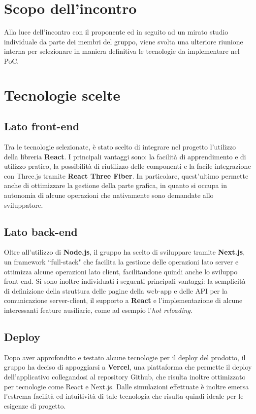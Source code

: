 \section{Scopo dell'incontro} \label{sec:argomenti}
Alla luce dell'incontro con il proponente ed in seguito ad un mirato studio individuale da parte dei membri del gruppo, viene svolta una ulteriore riunione interna per selezionare in maniera definitiva le tecnologie da implementare nel PoC. 

\section{Tecnologie scelte}
\subsection{Lato front-end}
Tra le tecnologie selezionate, è stato scelto di integrare nel progetto l'utilizzo della libreria \textbf{React}. I principali vantaggi sono: la facilità di apprendimento e 
di utilizzo pratico, la possibilità di riutilizzo delle componenti e la facile integrazione con Three.js tramite \textbf{React Three Fiber}. In particolare, quest'ultimo 
permette anche di ottimizzare la gestione della parte grafica, in quanto si occupa in autonomia di alcune operazioni che nativamente sono demandate allo sviluppatore.
\subsection{Lato back-end}
Oltre all'utilizzo di \textbf{Node.js}, il gruppo ha scelto di sviluppare tramite \textbf{Next.js}, un framework ``full-stack" che facilita la gestione delle 
operazioni lato server e ottimizza alcune operazioni lato client, facilitandone quindi anche lo sviluppo front-end. Si sono inoltre individuati i seguenti principali
vantaggi: la semplicità di definizione della struttura delle pagine della web-app e delle API per la comunicazione server-client, il supporto a \textbf{React} e 
l'implementazione di alcune interessanti feature ausiliarie, come ad esempio l'\textit{hot reloading}.
\subsection{Deploy}
Dopo aver approfondito e testato alcune tecnologie per il deploy del prodotto, il gruppo ha deciso di appoggiarsi a \textbf{Vercel}, una piattaforma che permette il 
deploy dell'applicativo collegandosi al repository Github, che risulta inoltre ottimizzato per tecnologie come React e Next.js. Dalle simulazioni effettuate è inoltre 
emersa l'estrema facilità ed intuitività di tale tecnologia che risulta quindi ideale per le esigenze di progetto.